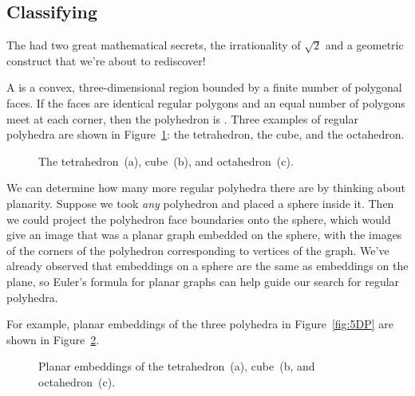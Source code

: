 \subsection{Classifying }

The  had two great mathematical secrets, the
irrationality of $\sqrt{2}$ and a geometric construct that we're about
to rediscover!

A  is a convex, three-dimensional region bounded by a
finite number of polygonal faces.  If the faces are identical regular
polygons and an equal number of polygons meet at each corner, then the
polyhedron is .  Three
examples of regular polyhedra are shown in Figure~\ref{fig:polyhedra}: the
tetrahedron, the cube, and the octahedron.

\begin{figure}

\quad
{}
\quad
{}

\caption{The tetrahedron~(a), cube~(b), and octahedron~(c).}

\label{fig:polyhedra}
\end{figure}

We can determine how many more regular polyhedra there are by thinking
about planarity.  Suppose we took \emph{any} polyhedron and placed a
sphere inside it.  Then we could project the polyhedron face
boundaries onto the sphere, which would give an image that was a
planar graph embedded on the sphere, with the images of the corners of
the polyhedron corresponding to vertices of the graph.  We've already
observed that embeddings on a sphere are the same as embeddings on the
plane, so Euler's formula for planar graphs can help guide our search
for regular polyhedra.

For example, planar embeddings of the three polyhedra in
Figure~\ref{fig:5DP} are shown in Figure~\ref{fig:5DQ}.

\begin{figure}

\quad
{}
\quad
{}

\caption{Planar embeddings of the tetrahedron~(a), cube~(b, and
  octahedron~(c).}

\label{fig:5DQ}

\end{figure}

